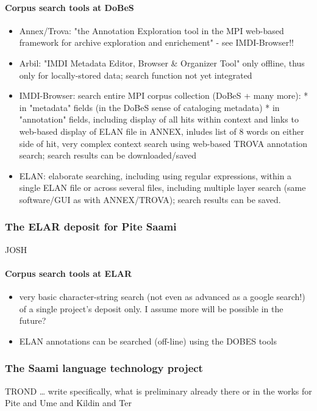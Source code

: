 \documentclass[a4paper,12pt]{article}
\begin{document}
\paragraph{Corpus search tools at DoBeS}
\begin{itemize}
\item Annex/Trova: "the Annotation Exploration tool in the MPI web-based framework for archive exploration and enrichement" - see IMDI-Browser!!
\item Arbil: "IMDI Metadata Editor, Browser \& Organizer Tool" only offline, thus only for locally-stored data; search function not yet integrated
\item IMDI-Browser: search entire MPI corpus collection (DoBeS + many more):
	* in "metadata" fields (in the DoBeS sense of cataloging metadata)
	* in "annotation" fields, including display of all hits within context and links to web-based display of ELAN file in ANNEX, inludes list of 8 words on either side of hit, very complex context search using web-based TROVA annotation search; search results can be downloaded/saved
\item ELAN: elaborate searching, including using regular expressions, within a single ELAN file or across several files, including multiple layer search (same software/GUI as with ANNEX/TROVA); search results can be saved.	
\end{itemize}

\subsubsection{The ELAR deposit for Pite Saami}
JOSH

\paragraph{Corpus search tools at ELAR} 
\begin{itemize}
\item very basic character-string search (not even as advanced as a google search!) of a single project's deposit only. I assume more will be possible in the future?
\item ELAN annotations can be searched (off-line) using the DOBES tools
\end{itemize}

\subsubsection{The Saami language technology project}
TROND … write specifically, what is preliminary already there or in the works for Pite and Ume and Kildin and Ter
\end{document}
